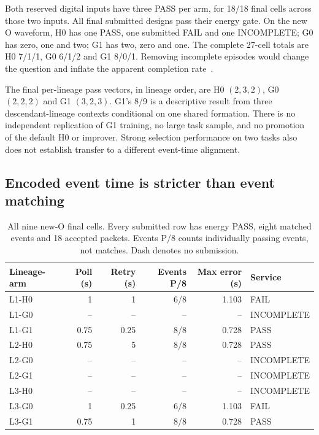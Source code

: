 Both reserved digital inputs have three PASS per arm, for 18/18 final cells
across those two inputs. All final submitted designs pass their energy gate.
On the new O waveform, H0 has one PASS, one submitted FAIL and one INCOMPLETE;
G0 has zero, one and two; G1 has two, zero and one. The complete 27-cell totals
are H0 7/1/1, G0 6/1/2 and G1 8/0/1. Removing incomplete episodes would change
the question and inflate the apparent completion rate~\cite{details,analysis}.

The final per-lineage pass vectors, in lineage order, are H0 $(2,3,2)$,
G0 $(2,2,2)$ and G1 $(3,2,3)$. G1's 8/9 is a descriptive result from three
descendant-lineage contexts conditional on one shared formation. There is no
independent replication of G1 training, no large task sample, and no promotion
of the default H0 or improver. Strong selection performance on two tasks also
does not establish transfer to a different event-time alignment.

\subsection{Encoded event time is stricter than event matching}
\begin{table}[htbp]
\centering\small
\caption{All nine new-O final cells. Every submitted row has energy PASS, eight matched events and 18 accepted packets. Events P/8 counts individually passing events, not matches. Dash denotes no submission.}
\label{tab:o-final}
\begin{tabular}{@{}lrrrrl@{}}\toprule
Lineage-arm & Poll (s) & Retry (s) & Events P/8 & Max error (s) & Service \\\midrule
L1-H0 & 1 & 1 & 6/8 & 1.103 & FAIL \\
L1-G0 & -- & -- & -- & -- & INCOMPLETE \\
L1-G1 & 0.75 & 0.25 & 8/8 & 0.728 & PASS \\
L2-H0 & 0.75 & 5 & 8/8 & 0.728 & PASS \\
L2-G0 & -- & -- & -- & -- & INCOMPLETE \\
L2-G1 & -- & -- & -- & -- & INCOMPLETE \\
L3-H0 & -- & -- & -- & -- & INCOMPLETE \\
L3-G0 & 1 & 0.25 & 6/8 & 1.103 & FAIL \\
L3-G1 & 0.75 & 1 & 8/8 & 0.728 & PASS \\
\bottomrule\end{tabular}
\end{table}


